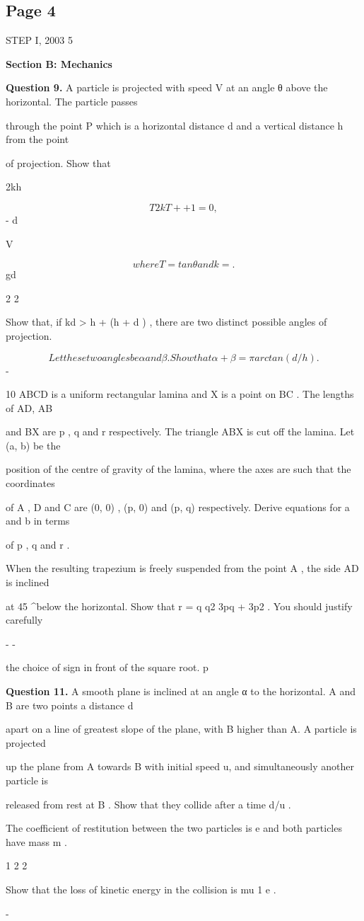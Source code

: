 \documentclass[12pt]{article}
\begin{document}
\subsection*{Page 4}
\begin{flushleft}
STEP I, 2003 5\par
\bigskip\textbf{Section B: Mechanics}\par
\bigskip\textbf{Question 9.} A particle is projected with speed V at an angle θ above the horizontal. The particle passes\par
through the point P which is a horizontal distance d and a vertical distance h from the point\par
of projection. Show that\par
2kh\par
\[T 2kT + + 1 = 0 ,\]
- d\par
V\par
\[where T = tan θ and k = .\]
gd\par
2 2\par
Show that, if kd > h + \sqrt(h + d ) , there are two distinct possible angles of projection.\par
\[Let these two angles be α and β. Show that α + β = \pi arctan(d/h) .\]
-\par
10 ABCD is a uniform rectangular lamina and X is a point on BC . The lengths of AD, AB\par
and BX are p , q and r respectively. The triangle ABX is cut off the lamina. Let (a, b) be the\par
position of the centre of gravity of the lamina, where the axes are such that the coordinates\par
of A , D and C are (0, 0) , (p, 0) and (p, q) respectively. Derive equations for a and b in terms\par
of p , q and r .\par
When the resulting trapezium is freely suspended from the point A , the side AD is inclined\par
at 45 \textasciicircum{}\circ below the horizontal. Show that r = q q2 3pq + 3p2 . You should justify carefully\par
- -\par
the choice of sign in front of the square root. p\par
\bigskip\textbf{Question 11.} A smooth plane is inclined at an angle α to the horizontal. A and B are two points a distance d\par
apart on a line of greatest slope of the plane, with B higher than A. A particle is projected\par
up the plane from A towards B with initial speed u, and simultaneously another particle is\par
released from rest at B . Show that they collide after a time d/u .\par
The coefficient of restitution between the two particles is e and both particles have mass m .\par
1 2 2\par
Show that the loss of kinetic energy in the collision is mu 1 e .\par
-\par
\end{flushleft}
\end{document}

